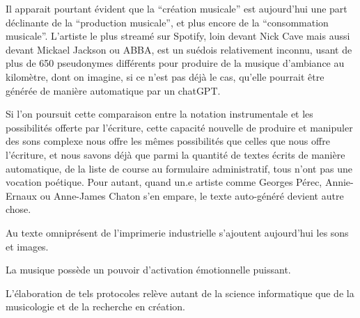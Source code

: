 Il apparait pourtant évident que la ``création musicale'' est aujourd'hui une part déclinante de la ``production musicale'', et plus encore de la ``consommation musicale''. L'artiste le plus streamé sur Spotify, loin devant Nick Cave mais aussi devant Mickael Jackson ou ABBA, est un suédois relativement inconnu, usant de plus de 650 pseudonymes différents pour produire de la musique d'ambiance au kilomètre, dont on imagine, si ce n'est pas déjà le cas, qu'elle pourrait être générée de manière automatique par un chatGPT. 

Si l'on poursuit cette comparaison entre la notation instrumentale et les possibilités offerte par l'écriture, cette capacité nouvelle de produire et manipuler des sons complexe nous offre les mêmes possibilités que celles que nous offre l'écriture, et nous savons déjà que parmi la quantité de textes écrits de manière automatique, de la liste de course au formulaire administratif, tous n'ont pas une vocation poétique. Pour autant, quand un.e artiste comme Georges Pérec, Annie-Ernaux ou Anne-James Chaton s'en empare, le texte auto-généré devient autre chose.

Au texte omniprésent de l'imprimerie industrielle s'ajoutent aujourd'hui les sons et images.

La musique possède un pouvoir d'activation émotionnelle puissant.



L'élaboration de tels protocoles relève autant de la science informatique que de la musicologie et de la recherche en création.



